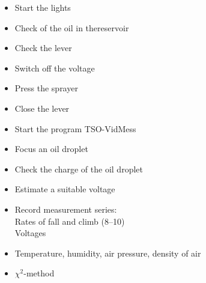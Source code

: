 \documentclass{tudphygp_eng}
\begin{document}
\renewcommand{\labelitemi}{\Large$\square$}
\begin{itemize}

 \item Start the lights
 \item Check of the oil in thereservoir
 \item Check the lever
 \item Switch off the voltage
 \item Press the sprayer
 \item Close the lever
 \item Start the program TSO-VidMess
 \item Focus an oil droplet
 \item Check the charge of the oil droplet
 \item Estimate a suitable voltage
 \item Record measurement series:\\
Rates of fall and climb (8--10)\\
Voltages
 \item Temperature, humidity, air pressure, density of air
 \item $\chi^2$-method

\end{itemize}
\end{document}
